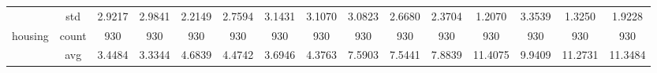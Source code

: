 \begin{table}[htbp]
{\begin{tabular}{rcccc|c|c|c|c|c|ccccc}
			                                                                               & std                                    & 2.9217                                                                             & 2.9841                                                                    & 2.2149                                                                    & 2.7594                                         & 3.1431                                                                    & 3.1070                                       & 3.0823                                      & 2.6680                                         & 2.3704                                         & 1.2070                                          & 3.3539                                          & 1.3250                                         & 1.9228                                         \\
			housing                                                                        & count                                  & 930                                                                                & 930                                                                       & 930                                                                       & 930                                            & 930                                                                       & 930                                          & 930                                         & 930                                            & 930                                            & 930                                             & 930                                             & 930                                            & 930                                            \\
			                                                                               & avg                                    & 3.4484                                                                             & \cellcolor[rgb]{ .776,  .937,  .808}\textcolor[rgb]{ 0,  .38,  0}{3.3344} & 4.6839                                                                    & 4.4742                                         & 3.6946                                                                    & 4.3763                                       & 7.5903                                      & 7.5441                                         & 7.8839                                         & 11.4075                                         & 9.9409                                          & 11.2731                                        & 11.3484                                        \\

\end{tabular}}
\end{table}
